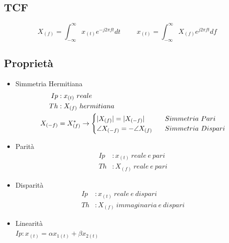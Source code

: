     \subsection{TCF}
        \[X_{(f)} = \int_{-\infty}^{\infty} x_{(t)} e^{-j2\pi ft} dt\hspace{1cm} x_{(t)} = \int_{-\infty}^{\infty} X_{(f)} e^{j2\pi ft} df\]
        \subsection{Proprietà}
            \begin{itemize}
                \item {Simmetria Hermitiana
                    \begin{align}
                        Ip&: x_{(t)}\ reale \nonumber \\
                        Th&: X_{(f)}\ hermitiana \nonumber \\ 
                        X_{(-f)} &= X_{(f)}^{*} \rightarrow
                            \begin{cases}
                                |X_{(f)}| = |X_{(-f)}| \hspace{0.3cm} & Simmetria\ Pari \\
                                \angle X_{(-f)} = -\angle X_{(f)}\hspace{0.3cm} & Simmetria\ Dispari
                            \end{cases} \nonumber
                    \end{align}
                }
                \item {Parità
                    \begin{align}
                        Ip&: x_{(t)}\ reale\ e\ pari  \nonumber \\
                        Th&: X_{(f)}\ reale\ e\ pari \nonumber  
                    \end{align}
                    }
                \item {Disparità
                    \begin{align}
                        Ip&: x_{(t)}\ reale\ e\ dispari  \nonumber \\
                        Th&: X_{(f)}\ immaginaria\ e\ dispari \nonumber 
                    \end{align}
                }
                \item{Linearità\\
                    $Ip: x_{(t)} = \alpha x_{1(t)} + \beta x_{2(t)}$\\        
}
\end{itemize}
